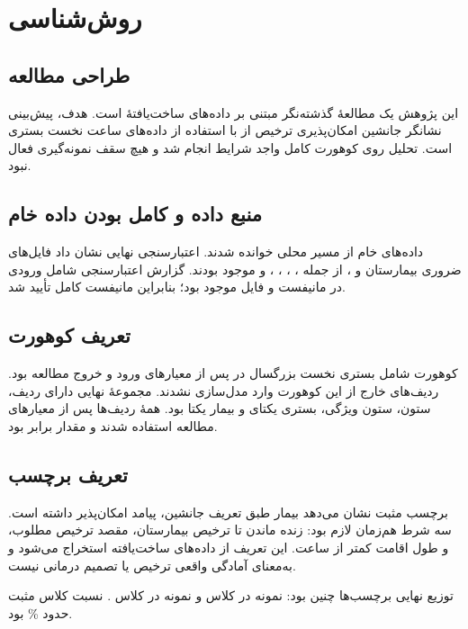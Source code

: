 \chapter{روش‌شناسی}
\label{ch:methodology}

\section{طراحی مطالعه}
این پژوهش یک مطالعۀ گذشته‌نگر مبتنی بر داده‌های ساخت‌یافتۀ  است. هدف، پیش‌بینی نشانگر جانشین امکان‌پذیری ترخیص از  با استفاده از داده‌های  ساعت نخست بستری است. تحلیل روی کوهورت کامل واجد شرایط انجام شد و هیچ سقف نمونه‌گیری فعال نبود.

\section{منبع داده و کامل بودن داده خام}
داده‌های خام از مسیر محلی \texttt{} خوانده شدند. اعتبارسنجی نهایی نشان داد فایل‌های ضروری بیمارستان و ، از جمله \texttt{}، \texttt{}، \texttt{}، \texttt{}، \texttt{} و \texttt{} موجود بودند. گزارش اعتبارسنجی شامل  ورودی در مانیفست و  فایل موجود بود؛ بنابراین مانیفست کامل تأیید شد.

\section{تعریف کوهورت}
کوهورت شامل بستری نخست بزرگسال در  پس از معیارهای ورود و خروج مطالعه بود. ردیف‌های خارج از این کوهورت وارد مدل‌سازی نشدند. مجموعۀ نهایی دارای \textbf{} ردیف،  ستون،  ستون ویژگی،  بستری یکتای  و  بیمار یکتا بود. همۀ ردیف‌ها پس از معیارهای مطالعه استفاده شدند و مقدار  برابر  بود.

\section{تعریف برچسب}
برچسب مثبت نشان می‌دهد بیمار طبق تعریف جانشین، پیامد امکان‌پذیر داشته است. سه شرط هم‌زمان لازم بود: زنده ماندن تا ترخیص بیمارستان، مقصد ترخیص مطلوب، و طول اقامت  کمتر از  ساعت. این تعریف از داده‌های ساخت‌یافته استخراج می‌شود و به‌معنای آمادگی واقعی ترخیص یا تصمیم درمانی نیست.

توزیع نهایی برچسب‌ها چنین بود:  نمونه در کلاس  و  نمونه در کلاس . نسبت کلاس مثبت حدود \% بود.

